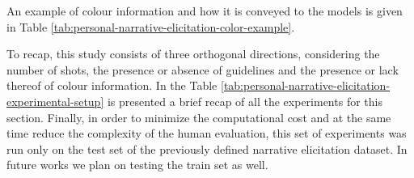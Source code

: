 
An example of colour information and how it is conveyed to the models is given in Table \ref{tab:personal-narrative-elicitation-color-example}. 

To recap, this study consists of three orthogonal directions, considering the number of shots, the presence or absence of guidelines and the presence or lack thereof of colour information. In the Table \ref{tab:personal-narrative-elicitation-experimental-setup} is presented a brief recap of all the experiments for this section. 
Finally, in order to minimize the computational cost and at the same time reduce the complexity of the human evaluation, this set of experiments was run only on the test set of the previously defined narrative elicitation dataset. In future works we plan on testing the train set as well.
